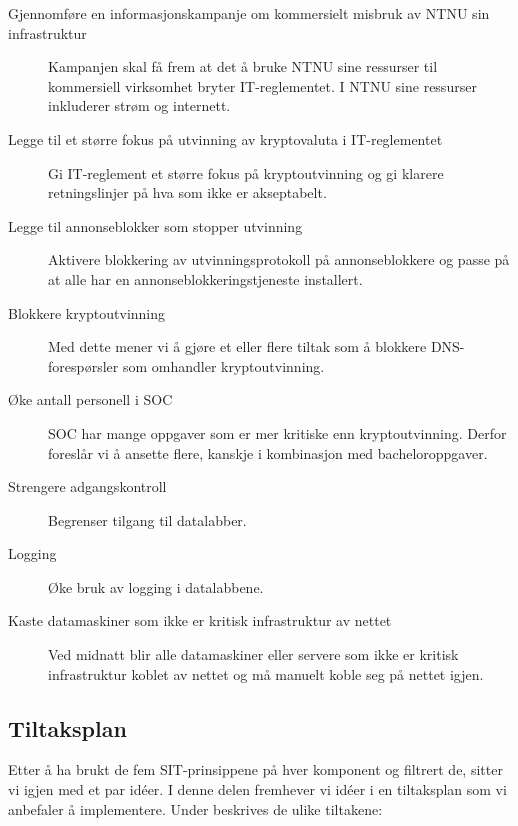 \begin{description}
\item[Gjennomføre en informasjonskampanje om kommersielt misbruk av NTNU sin infrastruktur] Kampanjen skal få frem at det å bruke NTNU sine ressurser til kommersiell virksomhet bryter IT-reglementet. I NTNU sine ressurser inkluderer strøm og internett. %
\item[Legge til et større fokus på utvinning av kryptovaluta i IT-reglementet] Gi IT-reglement et større fokus på kryptoutvinning og gi klarere retningslinjer på hva som ikke er akseptabelt.
\item[Legge til annonseblokker som stopper utvinning] Aktivere blokkering av utvinningsprotokoll på annonseblokkere og passe på at alle har en annonseblokkeringstjeneste installert.
\item[Blokkere kryptoutvinning] Med dette mener vi å gjøre et eller flere tiltak som å blokkere DNS-forespørsler som omhandler kryptoutvinning.  
\item[Øke antall personell i SOC] SOC har mange oppgaver som er mer kritiske enn kryptoutvinning. Derfor foreslår vi å ansette flere, kanskje i kombinasjon med bacheloroppgaver.
\item[Strengere adgangskontroll] Begrenser tilgang til datalabber. 
\item[Logging] Øke bruk av logging i datalabbene. 
\item[Kaste datamaskiner som ikke er kritisk infrastruktur av nettet] Ved midnatt blir alle datamaskiner eller servere som ikke er kritisk infrastruktur koblet av nettet og må manuelt koble seg på nettet igjen.
\end{description}

\subsection{Tiltaksplan}
Etter å ha brukt de fem SIT-prinsippene på hver komponent og filtrert de, sitter vi igjen med et par idéer. I denne delen fremhever vi idéer i en tiltaksplan som vi anbefaler å implementere. 
Under beskrives de ulike tiltakene:

